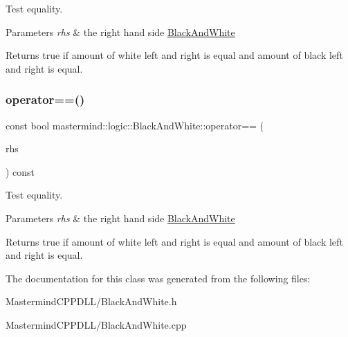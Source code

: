 Test equality. 


\begin{DoxyParams}{Parameters}
{\em rhs} & the right hand side \hyperlink{classmastermind_1_1logic_1_1_black_and_white}{Black\+And\+White} \\
\hline
\end{DoxyParams}
\begin{DoxyReturn}{Returns}
{\ttfamily true} if amount of white left and right is equal and amount of black left and right is equal. 
\end{DoxyReturn}
\hypertarget{classmastermind_1_1logic_1_1_black_and_white_a3487a018a0165166c3d351562cd946d7}{}\label{classmastermind_1_1logic_1_1_black_and_white_a3487a018a0165166c3d351562cd946d7} 
\subsubsection{\texorpdfstring{operator==()}{operator==()}\hspace{0.1cm}{\footnotesize\ttfamily [2/2]}}
{\footnotesize\ttfamily const bool mastermind\+::logic\+::\+Black\+And\+White\+::operator== (\begin{DoxyParamCaption}\item[{const \hyperlink{classmastermind_1_1logic_1_1_black_and_white}{Black\+And\+White} \&}]{rhs }\end{DoxyParamCaption}) const}



Test equality. 


\begin{DoxyParams}{Parameters}
{\em rhs} & the right hand side \hyperlink{classmastermind_1_1logic_1_1_black_and_white}{Black\+And\+White} \\
\hline
\end{DoxyParams}
\begin{DoxyReturn}{Returns}
{\ttfamily true} if amount of white left and right is equal and amount of black left and right is equal. 
\end{DoxyReturn}


The documentation for this class was generated from the following files\+:\begin{DoxyCompactItemize}
\item 
Mastermind\+C\+P\+P\+D\+L\+L/Black\+And\+White.\+h\item 
Mastermind\+C\+P\+P\+D\+L\+L/Black\+And\+White.\+cpp\end{DoxyCompactItemize}
